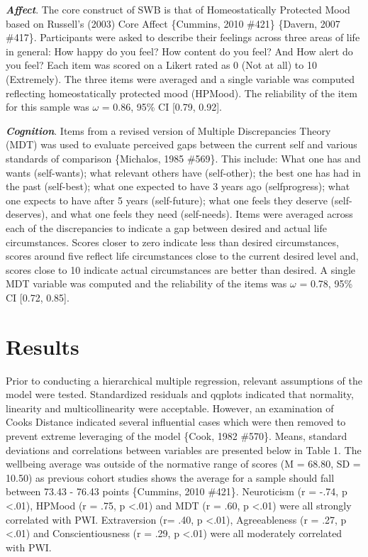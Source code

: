 \documentclass[man,floatsintext]{apa6}
\begin{document}
\textbf{\emph{Affect}}. The core construct of SWB is that of
Homeostatically Protected Mood based on Russell's (2003) Core Affect
\{Cummins, 2010 \#421\} \{Davern, 2007 \#417\}. Participants were asked
to describe their feelings across three areas of life in general: How
happy do you feel? How content do you feel? And How alert do you feel?
Each item was scored on a Likert rated as 0 (Not at all) to 10
(Extremely). The three items were averaged and a single variable was
computed reflecting homeostatically protected mood (HPMood). The
reliability of the item for this sample was \(\omega\) = 0.86, 95\% CI
{[}0.79, 0.92{]}.

\textbf{\emph{Cognition}}. Items from a revised version of Multiple
Discrepancies Theory (MDT) was used to evaluate perceived gaps between
the current self and various standards of comparison \{Michalos, 1985
\#569\}. This include: What one has and wants (self-wants); what
relevant others have (self-other); the best one has had in the past
(self-best); what one expected to have 3 years ago (selfprogress); what
one expects to have after 5 years (self-future); what one feels they
deserve (self-deserves), and what one feels they need (self-needs).
Items were averaged across each of the discrepancies to indicate a gap
between desired and actual life circumstances. Scores closer to zero
indicate less than desired circumstances, scores around five reflect
life circumstances close to the current desired level and, scores close
to 10 indicate actual circumstances are better than desired. A single
MDT variable was computed and the reliability of the items was
\(\omega\) = 0.78, 95\% CI {[}0.72, 0.85{]}.

\section{Results}\label{results-1}

Prior to conducting a hierarchical multiple regression, relevant
assumptions of the model were tested. Standardized residuals and qqplots
indicated that normality, linearity and multicollinearity were
acceptable. However, an examination of Cooks Distance indicated several
influential cases which were then removed to prevent extreme leveraging
of the model \{Cook, 1982 \#570\}. Means, standard deviations and
correlations between variables are presented below in Table 1. The
wellbeing average was outside of the normative range of scores (M =
68.80, SD = 10.50) as previous cohort studies shows the average for a
sample should fall between 73.43 - 76.43 points \{Cummins, 2010 \#421\}.
Neuroticism (r = -.74, p \textless{}.01), HPMood (r = .75, p
\textless{}.01) and MDT (r = .60, p \textless{}.01) were all strongly
correlated with PWI. Extraversion (r= .40, p \textless{}.01),
Agreeableness (r = .27, p \textless{}.01) and Conscientiousness (r =
.29, p \textless{}.01) were all moderately correlated with PWI.
\end{document}
